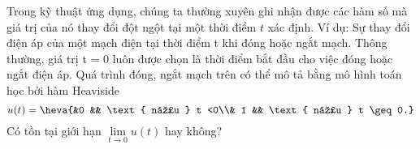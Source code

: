 \begin{bt}%
	Trong kỹ thuật ứng dụng, chúng ta thường xuyên ghi nhận được các hàm số mà giá trị của nó thay đổi đột ngột tại một thời điểm $t$ xác định. Ví dụ:  Sự thay đổi điện áp của một mạch điện tại thời điểm t khi đóng hoặc ngắt mạch. Thông thường, giá trị t = 0 luôn được chọn là thời điểm bắt đầu cho việc đóng hoặc ngắt điện áp. Quá trình đóng, ngắt mạch trên có thể mô tả bằng mô hình toán học bởi hàm Heaviside
	\[
	u(t) = \heva{&0 && \text{ nếu } t <0\\& 1 && \text{ nếu } t \geq 0.}
	\]
	Có tồn tại giới hạn $\displaystyle \lim \limits_{t\to 0} u(t)$ hay không?
\end{bt}

